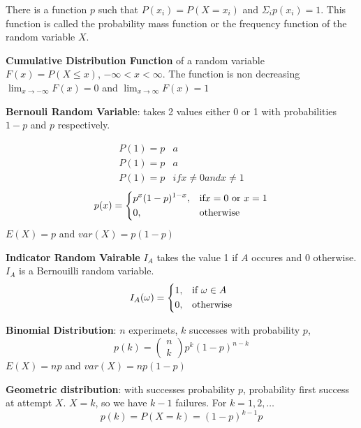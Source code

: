 \documentclass{article}
\begin{document}
\begin{multicols*}{2}
    There is a function $p$ such that $P \left( x_i \right) = P \left( X = x_i \right)$ and $\Sigma_i p\left(x_i \right) =1$.
    This function is called the probability mass function or the frequency function of the random variable $X$.

    \textbf{Cumulative Distribution Function} of a random variable $F \left( x \right) = P \left( X \leq x\right)$, $- \infty < x < \infty$.
    The function is non decreasing  $\lim_{x\rightarrow -\infty} F\left( x \right) = 0$ and $\lim_{x\rightarrow \infty} F\left( x \right) = 1$

    \textbf{Bernouli Random Variable}: takes 2 values either 0 or 1 with probabilities $1-p$ and $p$ respectively.

    \[
        \begin{matrix}
            P\left( 1 \right) = p & a                        \\
            P\left( 1 \right) = p & a                        \\
            P\left( 1 \right) = p & if x \neq 0 and x \neq 1
        \end{matrix}
    \]
    \[
        p(x) =\begin{dcases}
            p^x (1-p)^{1-x}, & \text{if} x = 0 \text{ or } x=1 \\
            0,               & \text{otherwise}                \\
        \end{dcases}
    \]
    $E(X) = p$ and $var(X) = p(1-p)$

    \textbf{Indicator Random Vairable} $I_A$ takes the value 1 if $A$ occures and 0 otherwise.
    $I_A$ is a Bernouilli random variable.
    \[
        I_A(\omega) =\begin{dcases}
            1, & \text{if } \omega\in A \\
            0, & \text{otherwise}       \\
        \end{dcases}
    \]

    \textbf{Binomial Distribution}: $n$ experimets, $k$ successes with probability $p$,
    \[
        p(k) = \begin{pmatrix}
            n \\
            k
        \end{pmatrix} p^k \left(1-p\right)^{n-k}
    \]
    $E(X) = np$ and $var(X) = np(1-p)$

    \textbf{Geometric distribution}: with successes probability $p$, probability first success at attempt $X$. $X=k$, so we have $k-1$ failures.
    For $k=1, 2, \dots$
    \[
        p\left( k \right) = P\left( X=k \right) = \left( 1 - p \right)^{k-1}p
    \]


\end{multicols*}
\end{document}
